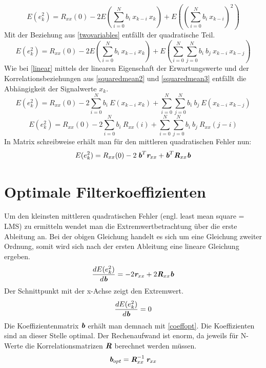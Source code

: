 \documentclass[
    10pt, %
    DIV12,
    english, %
    a5paper, %
    twoside, %
    titlepage, %
    parskip=half, %
    headings=small, %
    listof=totoc, %
    bibliography=totoc, %
    index=totoc, %
    captions=tableheading, %
    final %
]{scrbook}
\begin{document}
\begin{equation}
E(e_k^2)=R_{xx}(0)-2E\left(\sum_{i=0}^{N}b_i\:x_{k-i}\:x_k\right)+E\left(\left(\sum_{i=0}^{N}b_i\:x_{k-i}\right)^2\right)\nonumber
\end{equation}
Mit der Beziehung aus \eqref{twovariables} entfällt der quadratische Teil.
\begin{equation}
E(e_k^2)=R_{xx}(0)-2E\left(\sum_{i=0}^{N}b_i\:x_{k-i}\:x_k\right)+E\left(\sum_{i=0}^{N}\sum_{j=0}^{N}b_i\:b_j\:x_{k-i}\:x_{k-j}\right)\nonumber
\end{equation}
Wie bei \eqref{linear} mittels der linearen Eigenschaft der Erwartungswerte und der Korrelationsbeziehungen aus \eqref{squaredmean2} und \eqref{squaredmean3} entfällt die 
Abhängigkeit der Signalwerte $x_k$.
\begin{equation}
E(e_k^2)=R_{xx}(0)-2\sum_{i=0}^{N}b_i\:E(x_{k-i}\:x_k)+\sum_{i=0}^{N}\sum_{j=0}^{N}b_i\:b_j\:E(x_{k-i}\:x_{k-j})\nonumber
\end{equation}
\begin{equation}
E(e_k^2)=R_{xx}(0)-2\sum_{i=0}^{N}b_i\:R_{xx}(i)+\sum_{i=0}^{N}\sum_{j=0}^{N}b_i\:b_j\:R_{xx}(j-i)\nonumber
\end{equation}
In Matrix schreibweise erhält man für den mittleren quadratischen Fehler nun:
\begin{equation}\label{msecoeff}
E(e_k^2)=R_{xx}(0)-2\:\textit{\textbf{b}}^T\textit{\textbf{r}}_{xx}+\textit{\textbf{b}}^T\textit{\textbf{R}}_{xx}\textit{\textbf{b}}
\end{equation}

\section{Optimale Filterkoeffizienten}
Um den kleinsten mittleren quadratischen Fehler (engl. least mean square = LMS) zu ermitteln wendet man die Extremwertbetrachtung über die erste Ableitung an. Bei der obigen Gleichung handelt es sich um eine
Gleichung zweiter Ordnung, somit wird sich nach der ersten Ableitung eine lineare Gleichung ergeben. 
\begin{equation}\label{msederived}
\frac{dE(e_k^2)}{d\textit{\textbf{b}}}=-2\textit{\textbf{r}}_{xx}+2\textit{\textbf{R}}_{xx}\textit{\textbf{b}}
\end{equation}
Der Schnittpunkt mit der x-Achse zeigt den Extremwert.
\begin{equation}
\frac{dE(e_k^2)}{d\textit{\textbf{b}}}=0\nonumber
\end{equation}
Die Koeffizientenmatrix $\textit{\textbf{b}}$ erhält man demnach mit \eqref{coeffopt}. Die Koeffizienten sind an dieser Stelle optimal. Der Rechenaufwand ist enorm, da jeweils für N-Werte 
die Korrelationsmatrizen $\textit{\textbf{R}}$ berechnet werden müssen.
\begin{equation}\label{coeffopt}
\textit{\textbf{b}}_{opt}=\textit{\textbf{R}}_{xx}^{-1}\:\textit{\textbf{r}}_{xx}
\end{equation}
\end{document}
